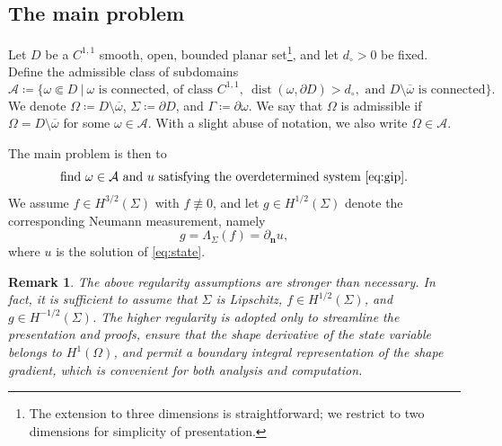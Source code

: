 \documentclass[a4paper,11pt]{article}
\newtheorem{remark}{Remark}
\newcommand{\vect}[1]{\boldsymbol{\mathbf{#1}}}
\newcommand{\nn}{\vect{n}}
\begin{document}
\subsection{The main problem} 
Let $D$ be a ${C}^{1,1}$ smooth, open, bounded planar set\footnote{The extension to three dimensions is straightforward; we restrict to two dimensions for simplicity of presentation.}, and let ${d_{\circ}} > 0$ be fixed.
Define the admissible class of subdomains
%
\begin{equation}
\label{eq:admissible_domains}
\mathcal{A} \coloneqq \big\{ \omega \Subset D \ \big| \ \omega \text{ is connected, of class } C^{1,1}, \ \operatorname{dist}(\omega,\partial D) > {d_{\circ}}, \text{ and } D \setminus \overline{\omega} \text{ is connected} \big\}.
\end{equation}
We denote $\varOmega \coloneqq D \setminus \overline{\omega}$, $\varSigma \coloneqq \partial D$, and $\varGamma \coloneqq \partial \omega$.
We say that $\varOmega$ is admissible if $\varOmega = D \setminus \overline{\omega}$ for some $\omega \in \mathcal{A}$.
With a slight abuse of notation, we also write $\varOmega \in \mathcal{A}$.

The main problem is then to
\begin{equation}\label{eq:shape_problem}
	\text{find $\omega \in \mathcal{A}$ and $u$ satisfying the overdetermined system \eqref{eq:gip}}.
\end{equation}
We assume $f \in H^{3/2}(\varSigma)$ with $f \not\equiv 0$, and let $g \in H^{1/2}(\varSigma)$ denote the corresponding Neumann measurement, namely
\[
g=\Lambda_{\varSigma}(f)=\partial_{\nn}u,
\]
where $u$ is the solution of \eqref{eq:state}.

\begin{remark}\label{rem:data_regularity}
The above regularity assumptions are stronger than necessary. In fact, it is sufficient to assume that $\varSigma$ is Lipschitz, $f \in H^{1/2}(\varSigma)$, and $g \in H^{-1/2}(\varSigma)$. The higher regularity is adopted only to streamline the presentation and proofs, ensure that the shape derivative of the state variable belongs to $H^1(\varOmega)$, and permit a boundary integral representation of the shape gradient, which is convenient for both analysis and computation.
\end{remark}

%
%
% 
\end{document}
